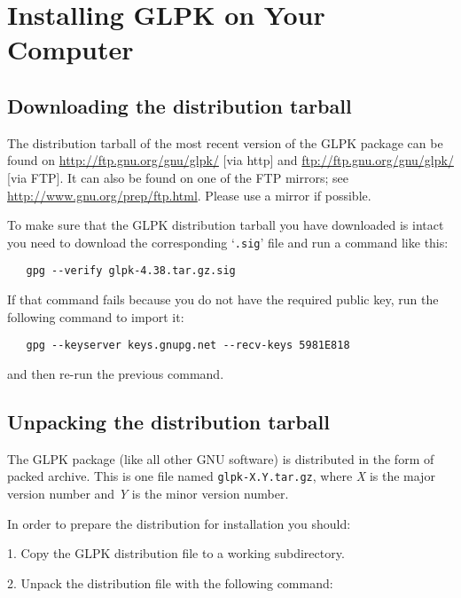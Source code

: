 
\chapter{Installing GLPK on Your Computer}
\label{install}

\section{Downloading the distribution tarball}

The distribution tarball of the most recent version of the GLPK
package can be found on \url{http://ftp.gnu.org/gnu/glpk/} [via http]
and \url{ftp://ftp.gnu.org/gnu/glpk/} [via FTP]. It can also be found
on one of the FTP mirrors; see \url{http://www.gnu.org/prep/ftp.html}.
Please use a mirror if possible.

To make sure that the GLPK distribution tarball you have downloaded is
intact you need to download the corresponding `\verb|.sig|' file and
run a command like this:

\begin{verbatim}
   gpg --verify glpk-4.38.tar.gz.sig
\end{verbatim}

\noindent
If that command fails because you do not have the required public key,
run the following command to import it:

\begin{verbatim}
   gpg --keyserver keys.gnupg.net --recv-keys 5981E818
\end{verbatim}

\noindent
and then re-run the previous command.

\section{Unpacking the distribution tarball}

The GLPK package (like all other GNU software) is distributed in the
form of packed archive. This is one file named \verb|glpk-X.Y.tar.gz|,
where {\it X} is the major version number and {\it Y} is the minor
version number.

In order to prepare the distribution for installation you should:

\medskip

1. Copy the GLPK distribution file to a working subdirectory.

\medskip

2. Unpack the distribution file with the following command:

